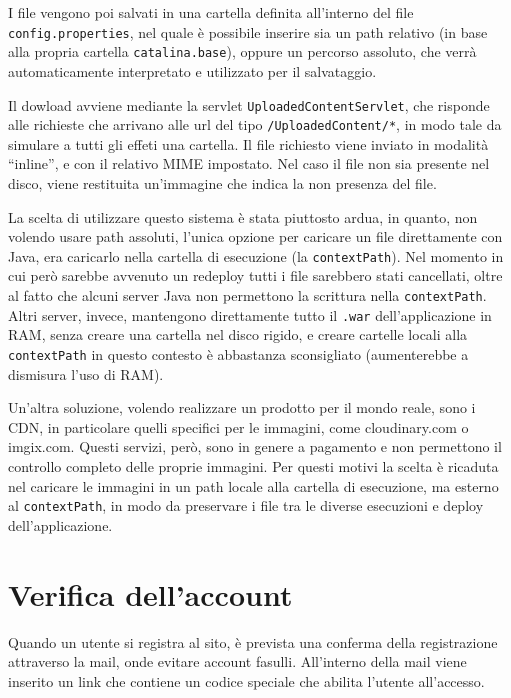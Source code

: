 I file vengono poi salvati in una cartella definita all'interno del file \texttt{config.properties}, nel quale è possibile inserire sia un path relativo (in base alla propria cartella \texttt{catalina.base}), oppure un percorso assoluto, che verrà automaticamente interpretato e utilizzato per il salvataggio.

Il dowload avviene mediante la servlet \texttt{UploadedContentServlet}, che risponde alle richieste che arrivano alle url del tipo \texttt{/UploadedContent/*}, in modo tale da simulare a tutti gli effeti una cartella. Il file richiesto viene inviato in modalità ``inline'', e con il relativo MIME impostato. Nel caso il file non sia presente nel disco, viene restituita un'immagine che indica la non presenza del file.

La scelta di utilizzare questo sistema è stata piuttosto ardua, in quanto, non volendo usare path assoluti, l'unica opzione per caricare un file direttamente con Java, era caricarlo nella cartella di esecuzione (la \texttt{contextPath}). Nel momento in cui però sarebbe avvenuto un redeploy tutti i file sarebbero stati cancellati, oltre al fatto che alcuni server Java non permettono la scrittura nella \texttt{contextPath}. Altri server, invece, mantengono direttamente tutto il \texttt{.war} dell'applicazione in RAM, senza creare una cartella nel disco rigido, e creare cartelle locali alla \texttt{contextPath} in questo contesto è abbastanza sconsigliato (aumenterebbe a dismisura l'uso di RAM).

Un'altra soluzione, volendo realizzare un prodotto per il mondo reale, sono i CDN, in particolare quelli specifici per le immagini, come cloudinary.com o imgix.com. Questi servizi, però, sono in genere a pagamento e non permettono il controllo completo delle proprie immagini. Per questi motivi la scelta è ricaduta nel caricare le immagini in un path locale alla cartella di esecuzione, ma esterno al \texttt{contextPath}, in modo da preservare i file tra le diverse esecuzioni e deploy dell'applicazione.




\chapter{Verifica dell'account}

Quando un utente si registra al sito, è prevista una conferma della registrazione attraverso la mail, onde evitare account fasulli. All'interno della mail viene inserito un link che contiene un codice speciale che abilita l'utente all'accesso.

